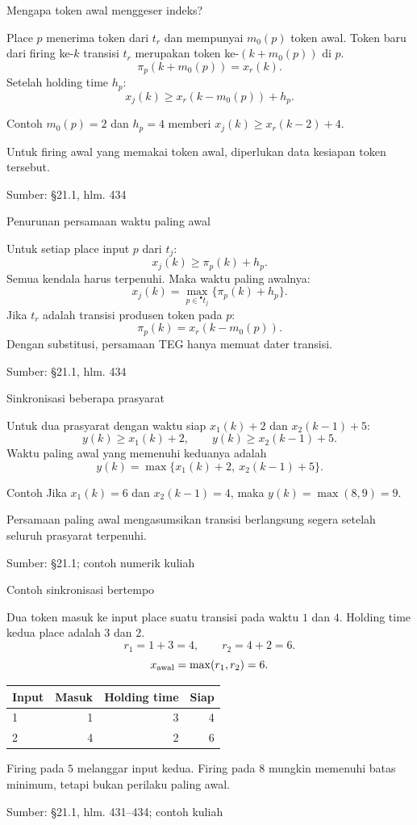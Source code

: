 \documentclass[aspectratio=169,11pt]{beamer}
\newcommand{\source}[1]{%
    \vfill
    \hfill{\tiny\color{gray}Sumber: #1}
}
\begin{document}
\begin{frame}{Mengapa token awal menggeser indeks?}

Place $p$ menerima token dari $t_r$ dan mempunyai $m_0(p)$ token awal.
Token baru dari firing ke-$k$ transisi $t_r$ merupakan token ke-$(k+m_0(p))$ di $p$.
\[
\pi_p(k+m_0(p))=x_r(k).
\]
Setelah holding time $h_p$:
\[
x_j(k)\ge x_r(k-m_0(p))+h_p.
\]
\begin{exampleblock}{Contoh}
$m_0(p)=2$ dan $h_p=4$ memberi
$x_j(k)\ge x_r(k-2)+4$.
\end{exampleblock}
Untuk firing awal yang memakai token awal, diperlukan data kesiapan token tersebut.

\source{\S21.1, hlm. 434}
\end{frame}
\begin{frame}{Penurunan persamaan waktu paling awal}

Untuk setiap place input $p$ dari $t_j$:
\[
x_j(k)\ge\pi_p(k)+h_p.
\]
Semua kendala harus terpenuhi. Maka waktu paling awalnya:
\[
x_j(k)=\max_{p\in{}^\bullet t_j}\{\pi_p(k)+h_p\}.
\]
Jika $t_r$ adalah transisi produsen token pada $p$:
\[
\pi_p(k)=x_r(k-m_0(p)).
\]
Dengan substitusi, persamaan TEG hanya memuat dater transisi.

\source{\S21.1, hlm. 434}
\end{frame}
\begin{frame}{Sinkronisasi beberapa prasyarat}


Untuk dua prasyarat dengan waktu siap $x_1(k)+2$ dan $x_2(k-1)+5$:
\[
y(k)\ge x_1(k)+2,\qquad y(k)\ge x_2(k-1)+5.
\]
Waktu paling awal yang memenuhi keduanya adalah
\[
y(k)=\max\{x_1(k)+2,\ x_2(k-1)+5\}.
\]
\begin{exampleblock}{Contoh}
Jika $x_1(k)=6$ dan $x_2(k-1)=4$, maka $y(k)=\max(8,9)=9$.
\end{exampleblock}
Persamaan paling awal mengasumsikan transisi berlangsung segera setelah seluruh prasyarat terpenuhi.

\source{\S21.1; contoh numerik kuliah}

\end{frame}
\begin{frame}{Contoh sinkronisasi bertempo}

Dua token masuk ke input place suatu transisi pada waktu $1$ dan $4$.
Holding time kedua place adalah $3$ dan $2$.
\[
r_1=1+3=4,\qquad r_2=4+2=6.
\]
\[
x_{\rm awal}=\max(r_1,r_2)=6.
\]
\begin{center}\begin{tabular}{lrrr}\toprule
Input&Masuk&Holding time&Siap\\\midrule
1&1&3&4\\
2&4&2&6\\\bottomrule
\end{tabular}\end{center}
Firing pada $5$ melanggar input kedua. Firing pada $8$ mungkin memenuhi batas
minimum, tetapi bukan perilaku paling awal.

\source{\S21.1, hlm. 431--434; contoh kuliah}
\end{frame}
\end{document}

